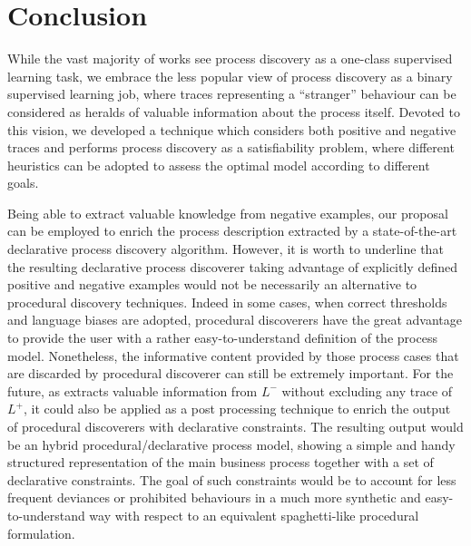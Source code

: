 \section{Conclusion}
\label{sec:concl}
While the vast majority of works see process discovery as a one-class supervised learning task, we embrace the less popular view of process discovery as a binary supervised learning job, where traces representing a ``stranger'' behaviour can be considered as heralds of valuable information about the process itself. Devoted to this vision, we developed a technique which considers both positive and negative traces and performs process discovery as a satisfiability problem, where different heuristics can be adopted to assess the optimal model according to different goals.  

Being able to extract valuable knowledge from negative examples, our proposal \nd can be employed to enrich the process description extracted by a state-of-the-art declarative process discovery algorithm.
However, it is worth to underline that the resulting declarative process discoverer taking advantage of explicitly defined positive and negative examples would not be necessarily an alternative to procedural discovery techniques. 
Indeed in some cases, when correct thresholds and language biases are adopted, procedural discoverers have the great advantage to provide the user with a rather easy-to-understand definition of the process model. Nonetheless, the informative content provided by those process cases that are discarded by procedural discoverer can still be extremely important. 
For the future, as \nd extracts valuable information from $L^-$ without excluding any trace of $L^+$, it could also be applied as a post processing technique to enrich the output of procedural discoverers with declarative constraints.
The resulting output would be an hybrid procedural/declarative process model, showing a simple and handy structured representation of the main business process together with a set of declarative constraints. The goal of such constraints would be to account for less frequent deviances or prohibited behaviours in a much more synthetic and easy-to-understand way with respect to an equivalent spaghetti-like procedural formulation.

